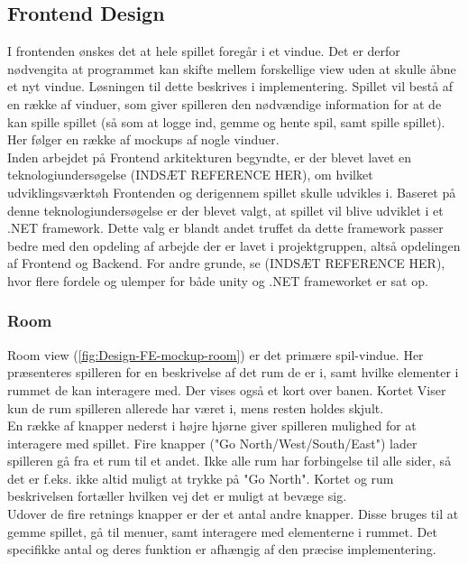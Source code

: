 \subsection{Frontend Design}

I frontenden ønskes det at hele spillet foregår i et vindue. Det er derfor nødvengita at programmet kan skifte mellem forskellige view uden at skulle åbne et nyt vindue. Løsningen til dette beskrives i implementering.
Spillet vil bestå af en række af vinduer, som giver spilleren den nødvændige information for at de kan spille spillet (så som at logge ind, gemme og hente spil, samt spille spillet). Her følger en række af mockups af nogle vinduer.\\ 
Inden arbejdet på Frontend arkitekturen begyndte, er der blevet lavet en teknologiundersøgelse (INDSÆT REFERENCE HER), om hvilket udviklingsværktøh Frontenden og derigennem spillet skulle udvikles i. Baseret på denne teknologiundersøgelse er der blevet valgt, at spillet vil blive udviklet i et .NET framework. Dette valg er blandt andet truffet da dette framework passer bedre med den opdeling af arbejde der er lavet i projektgruppen, altså opdelingen af Frontend og Backend. For andre grunde, se (INDSÆT REFERENCE HER), hvor flere fordele og ulemper for både unity og .NET frameworket er sat op.


\subsubsection{Room}

Room view (\autoref{fig:Design-FE-mockup-room}) er det primære spil-vindue. Her præsenteres spilleren for en beskrivelse af det rum de er i, samt hvilke elementer i rummet de kan interagere med. Der vises også et kort over banen. Kortet Viser kun de rum spilleren allerede har været i, mens resten holdes skjult.\\
En række af knapper nederst i højre hjørne giver spilleren mulighed for at interagere med spillet. Fire knapper ("Go {North/West/South/East}") lader spilleren gå fra et rum til et andet. Ikke alle rum har forbingelse til alle sider, så det er f.eks. ikke altid muligt at trykke på "Go North". Kortet og rum beskrivelsen fortæller hvilken vej det er muligt at bevæge sig.\\
Udover de fire retnings knapper er der et antal andre knapper. Disse bruges til at gemme spillet, gå til menuer, samt interagere med elementerne i rummet. Det specifikke antal og deres funktion er afhængig af den præcise implementering.

